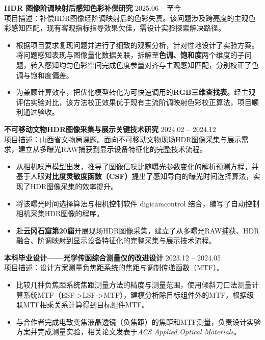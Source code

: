 \documentclass[11pt]{article}
\newlength{\interProjectSpacing}
\newcommand{\projectsep}{\vspace{\interProjectSpacing}}
\newlength{\intraProjectTitleSep}
\newcommand{\titlebreak}{\\[\intraProjectTitleSep]}
\newlength{\intraProjectListTopSep}
\begin{document}
\projectsep

\textbf{HDR 图像阶调映射后感知色彩补偿研究} \hfill 2025.06 -- 至今 \titlebreak
项目描述：补偿HDR图像经阶调映射后的色彩失真。该问题涉及跨亮度的主观色彩感知匹配，现有客观指标指导效果欠佳，需设计实验探索解决路径。
\begin{itemize}[nosep, topsep=\intraProjectListTopSep]
    \item 根据项目要求复现问题并进行了细致的观察分析，针对性地设计了实验方案。将问题感知表现与图像量化数据关联，拆解至\textbf{色调、饱和度}两个维度的子问题，转入感知均匀色彩空间完成色度参量对齐与主观感知匹配，分别校正了色调与饱和度偏差。
    \item 为兼顾计算效率，把优化模型转化为可快速调用的\textbf{RGB三维查找表}。经主观评估实验对比，该方法校正效果优于现有主流阶调映射色彩校正算法，项目顺利通过验收。
\end{itemize}

\projectsep

\textbf{不可移动文物HDR图像采集与展示关键技术研究} \hfill 2024.02 -- 2024.12 \titlebreak
项目描述：山西省文物局课题。面向不可移动文物现场HDR图像采集与展示需求，建立从多曝光RAW捕获到显示设备特征化的完整技术流程。
\begin{itemize}[nosep, topsep=\intraProjectListTopSep]
    \item 从相机噪声模型出发，推导了图像信噪比随曝光参数变化的解析预测方程，并基于人眼\textbf{对比度灵敏度函数（CSF）}提出了感知导向的曝光时间选择算法，实现了HDR图像采集的效率提升。
    \item 将该曝光时间选择算法与相机控制软件 digicamcontrol 结合，编写了自动控制相机采集HDR图像的程序。
    \item 赴\textbf{云冈石窟第20窟}开展现场HDR图像采集，建立了从多曝光RAW捕获、HDR融合、阶调映射到显示设备特征化的完整采集与展示技术流程。
\end{itemize}

\projectsep

\textbf{本科毕业设计——光学传函综合测量仪的改进设计} \hfill 2023.12 -- 2024.05 \titlebreak
项目描述：设计方案测量负焦距系统的焦距与调制传递函数（MTF）。
\begin{itemize}[nosep, topsep=\intraProjectListTopSep]
    \item 比较几种负焦距系统焦距测量方法的精度与测量范围，使用倾斜刀口法测量计算系统MTF（ESF->LSF->MTF），建模分析除目标组件外的MTF，根据级联MTF相乘关系计算得到目标组件MTF。
    \item 与合作者完成电致变焦液晶透镜（负焦距）的焦距和MTF测量，负责设计实验方案并完成测量实验，相关论文发表于\textit{ACS Applied Optical Materials}。
\end{itemize}
\end{document}
